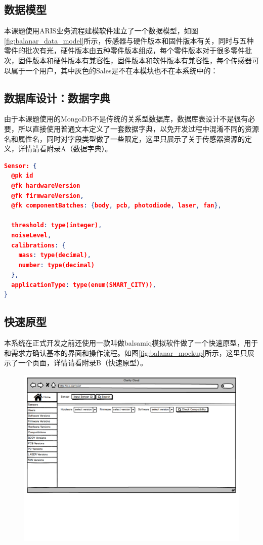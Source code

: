 \subsection{数据模型}
本课题使用ARIS业务流程建模软件建立了一个数据模型，如图\ref{fig:balanar_data_model}所示，传感器与硬件版本和固件版本有关，同时与五种零件的批次有光，硬件版本由五种零件版本组成，每个零件版本对于很多零件批次，固件版本和硬件版本有兼容性，固件版本和软件版本有兼容性，每个传感器可以属于一个用户，其中灰色的Sales是不在本模块也不在本系统中的：
\subsection{数据库设计：数据字典}
由于本课题使用的MongoDB不是传统的关系型数据库，数据库表设计不是很有必要，所以直接使用普通文本定义了一套数据字典，以免开发过程中混淆不同的资源名和属性名，同时对字段类型做了一些限定，这里只展示了关于传感器资源的定义，详情请看附录A（数据字典）。
\begin{lstlisting}[language={JSON}, caption={版本管理模块的数据字典}]
Sensor: {
  @pk id
  @fk hardwareVersion
  @fk firmwareVersion,
  @fk componentBatches: {body, pcb, photodiode, laser, fan},

  threshold: type(integer),
  noiseLevel,
  calibrations: {
    mass: type(decimal),
    number: type(decimal)
  },
  applicationType: type(enum(SMART_CITY)),
}
\end{lstlisting}

\subsection{快速原型}
本系统在正式开发之前还使用一款叫做balsamiq模拟软件做了一个快速原型，用于和需求方确认基本的界面和操作流程。如图\ref{fig:balanar_mockup}所示，这里只展示了一个页面，详情请看附录B（快速原型）。
\begin{figure}[H]
 \centering
 \includegraphics[width=\textwidth,page=8]{pdf/balanar_prototype.pdf}
\end{figure}

